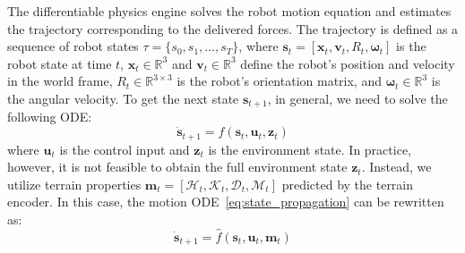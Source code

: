 The differentiable physics engine solves the robot motion equation and estimates
the trajectory corresponding to the delivered forces.
The trajectory is defined as a sequence of robot states $\tau = \{s_0, s_1, \ldots, s_T\}$,
where $\mathbf{s}_t = [\mathbf{x}_t, \mathbf{v}_t, R_t, \boldsymbol{\omega}_t]$
is the robot state at time $t$,
$\mathbf{x}_t \in \mathbb{R}^3$ and $\mathbf{v}_t \in \mathbb{R}^3$ define the robot's position and velocity in the world frame,
$R_t \in \mathbb{R}^{3 \times 3}$ is the robot's orientation matrix, and $\boldsymbol{\omega}_t \in \mathbb{R}^3$ is the angular velocity.
To get the next state $\mathbf{s}_{t+1}$, in general, we need to solve the following ODE:
\begin{equation}
    \label{eq:state_propagation}
    \mathbf{\dot{s}}_{t+1} = f(\mathbf{s}_t, \mathbf{u}_t, \mathbf{z}_t)
\end{equation}
where $\mathbf{u}_t$ is the control input and $\mathbf{z}_t$ is the environment state.
In practice, however, it is not feasible to obtain the full environment state $\mathbf{z}_t$.
Instead, we utilize terrain properties $\mathbf{m}_t = [\mathcal{H}_t, \mathcal{K}_t, \mathcal{D}_t, \mathcal{M}_t]$
predicted by the terrain encoder.
In this case, the motion ODE~\eqref{eq:state_propagation} can be rewritten as:
\begin{equation}
    \label{eq:state_propagation_terrain}
    \mathbf{\dot{s}}_{t+1} = \hat{f}(\mathbf{s}_t, \mathbf{u}_t, \mathbf{m}_t)
\end{equation}

